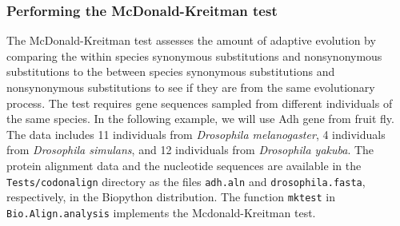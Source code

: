 \subsubsection*{Performing the McDonald-Kreitman test}

The McDonald-Kreitman test assesses the amount of adaptive evolution by comparing the within species synonymous substitutions and nonsynonymous substitutions to the between species synonymous substitutions and nonsynonymous substitutions to see if they are from the same evolutionary process. The test requires gene sequences sampled from different individuals of the same species. In the following example, we will use Adh gene from fruit fly. The data includes 11 individuals from \textit{Drosophila melanogaster}, 4 individuals from \textit{Drosophila simulans}, and 12 individuals from \textit{Drosophila yakuba}. The protein alignment data and the nucleotide sequences are available in the \verb+Tests/codonalign+ directory as the files \verb+adh.aln+ and \verb+drosophila.fasta+, respectively, in the Biopython distribution. The function \verb+mktest+ in \verb+Bio.Align.analysis+ implements the Mcdonald-Kreitman test.
